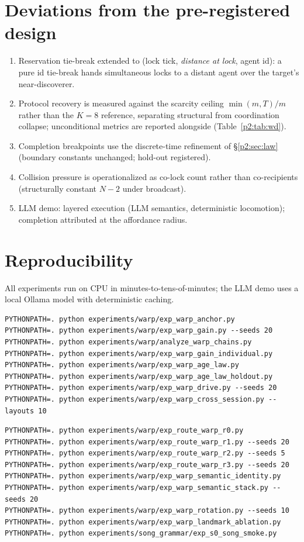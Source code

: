 \documentclass{article}
\begin{document}
\section{Deviations from the pre-registered design}
\label{p2:app:deviations}
\begin{enumerate}[leftmargin=20pt,itemsep=2pt,topsep=2pt]
\item Reservation tie-break extended to (lock tick, \emph{distance at
  lock}, agent id): a pure id tie-break hands simultaneous locks to a
  distant agent over the target's near-discoverer.
\item Protocol recovery is measured against the scarcity ceiling
  $\min(m,T)/m$ rather than the $K{=}8$ reference, separating
  structural from coordination collapse; unconditional metrics are
  reported alongside (Table~\ref{p2:tab:wd}).
\item Completion breakpoints use the discrete-time refinement of
  \S\ref{p2:sec:law} (boundary constants unchanged; hold-out registered).
\item Collision pressure is operationalized as co-lock count rather
  than co-recipients (structurally constant $N{-}2$ under broadcast).
\item LLM demo: layered execution (LLM semantics, deterministic
  locomotion); completion attributed at the affordance radius.
\end{enumerate}


\section{Reproducibility}
\label{p2:app:repro}
All experiments run on CPU in minutes-to-tens-of-minutes; the LLM demo
uses a local Ollama model with deterministic caching.
\begin{verbatim}
PYTHONPATH=. python experiments/warp/exp_warp_anchor.py
PYTHONPATH=. python experiments/warp/exp_warp_gain.py --seeds 20
PYTHONPATH=. python experiments/warp/analyze_warp_chains.py
PYTHONPATH=. python experiments/warp/exp_warp_gain_individual.py
PYTHONPATH=. python experiments/warp/exp_warp_age_law.py
PYTHONPATH=. python experiments/warp/exp_warp_age_law_holdout.py
PYTHONPATH=. python experiments/warp/exp_warp_drive.py --seeds 20
PYTHONPATH=. python experiments/warp/exp_warp_cross_session.py --layouts 10
\end{verbatim}


\label{p3:app:repro}
\begin{verbatim}
PYTHONPATH=. python experiments/warp/exp_route_warp_r0.py
PYTHONPATH=. python experiments/warp/exp_route_warp_r1.py --seeds 20
PYTHONPATH=. python experiments/warp/exp_route_warp_r2.py --seeds 5
PYTHONPATH=. python experiments/warp/exp_route_warp_r3.py --seeds 20
PYTHONPATH=. python experiments/warp/exp_warp_semantic_identity.py
PYTHONPATH=. python experiments/warp/exp_warp_semantic_stack.py --seeds 20
PYTHONPATH=. python experiments/warp/exp_warp_rotation.py --seeds 10
PYTHONPATH=. python experiments/warp/exp_warp_landmark_ablation.py
PYTHONPATH=. python experiments/song_grammar/exp_s0_song_smoke.py
\end{verbatim}
\FloatBarrier
\end{document}
